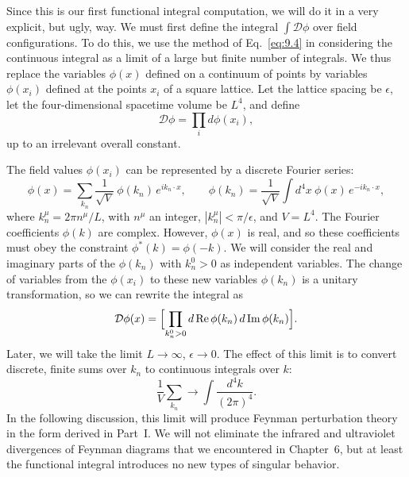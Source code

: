 Since this is our first functional integral computation, we will do it in a
very explicit, but ugly, way.  We must first define the integral
$\int\mathcal{D}\phi$ over field configurations.  To do this, we use the method
of Eq.~\eqref{eq:9.4} in considering the continuous integral as a limit of a
large but finite number of integrals.  We thus replace the variables
$\phi(x)$ defined on a continuum of points by variables $\phi(x_i)$ defined at
the points $x_i$ of a square lattice.  Let the lattice spacing be $\epsilon$,
let the four-dimensional spacetime volume be $L^4$, and define
\begin{equation}
  \mathcal{D}\phi = \prod_i d\phi(x_i),
  \label{eq:9.20}
\end{equation}
up to an irrelevant overall constant.

The field values $\phi(x_i)$ can be represented by a discrete Fourier series:
\begin{equation}
  \phi(x) = \sum_{k_n} \frac{1}{\sqrt{V}}\ \phi(k_n)\,e^{ik_n\cdot x},
  \qquad \phi(k_n) = \frac{1}{\sqrt{V}}\int d^4x\ \phi(x)\,e^{-ik_n\cdot x},
\end{equation}
where $k_n^\mu = 2\pi n^\mu/L$, with $n^\mu$ an integer, $|k_n^\mu| < \pi/\epsilon$,
and $V = L^4$.  The Fourier coefficients $\phi(k)$ are complex.  However,
$\phi(x)$ is real, and so these coefficients must obey the constraint
$\phi^{*}(k) = \phi(-k)$.  We will consider the real and imaginary parts of the
$\phi(k_n)$ with $k_n^0 > 0$ as independent variables.  The change of variables
from the $\phi(x_i)$ to these new variables $\phi(k_n)$ is a unitary
transformation, so we can rewrite the integral as
\begin{equation}
  \mathcal{D}\phi(x) = \Bigl[ \prod_{k_n^0>0} d\,\mathrm{Re}\,\phi(k_n)\,
    d\,\mathrm{Im}\,\phi(k_n) \Bigr] .
\end{equation}
Later, we will take the limit $L\to\infty$, $\epsilon\to 0$.  The effect of
this limit is to convert discrete, finite sums over $k_n$ to continuous
integrals over $k$:
\begin{equation}
  \frac{1}{V}\sum_{k_n} \to \int \frac{d^4k}{(2\pi)^4} .
  \label{eq:9.22}
\end{equation}
In the following discussion, this limit will produce Feynman perturbation
theory in the form derived in Part~I.  We will not eliminate the infrared and
ultraviolet divergences of Feynman diagrams that we encountered in Chapter~6,
but at least the functional integral introduces no new types of singular
behavior.

